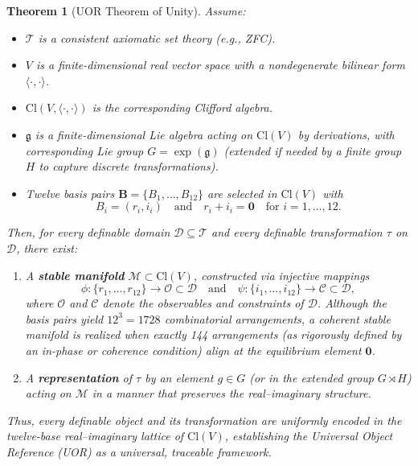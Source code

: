 \documentclass{article}
\newtheorem{theorem}{Theorem}[section]
\begin{document}
\begin{theorem}[UOR Theorem of Unity]
\label{thm:UORUnityFinal}
Assume:
\begin{itemize}
    \item $\mathcal{T}$ is a consistent axiomatic set theory (e.g., ZFC).
    \item $V$ is a finite-dimensional real vector space with a nondegenerate bilinear form $\langle\cdot,\cdot\rangle$.
    \item $\mathrm{Cl}(V,\langle\cdot,\cdot\rangle)$ is the corresponding Clifford algebra.
    \item $\mathfrak{g}$ is a finite-dimensional Lie algebra acting on $\mathrm{Cl}(V)$ by derivations, with corresponding Lie group $G = \exp(\mathfrak{g})$ (extended if needed by a finite group $H$ to capture discrete transformations).
    \item Twelve basis pairs $\mathbf{B} = \{B_1,\dots,B_{12}\}$ are selected in $\mathrm{Cl}(V)$ with
    \[
    B_i = (r_i, i_i) \quad \text{and} \quad r_i + i_i = \mathbf{0} \quad \text{for } i=1,\dots,12.
    \]
\end{itemize}
Then, for every definable domain $\mathcal{D}\subseteq \mathcal{T}$ and every definable transformation $\tau$ on $\mathcal{D}$, there exist:
\begin{enumerate}
    \item A \textbf{stable manifold} $\mathcal{M} \subset \mathrm{Cl}(V)$, constructed via injective mappings 
    \[
    \phi:\{r_1,\dots,r_{12}\}\to \mathcal{O}\subset \mathcal{D} \quad \text{and} \quad \psi:\{i_1,\dots,i_{12}\}\to \mathcal{C}\subset \mathcal{D},
    \]
    where $\mathcal{O}$ and $\mathcal{C}$ denote the observables and constraints of $\mathcal{D}$. Although the basis pairs yield $12^3=1728$ combinatorial arrangements, a coherent stable manifold is realized when exactly 144 arrangements (as rigorously defined by an in-phase or coherence condition) align at the equilibrium element $\mathbf{0}$.
    
    \item A \textbf{representation} of $\tau$ by an element $g \in G$ (or in the extended group $G \rtimes H$) acting on $\mathcal{M}$ in a manner that preserves the real--imaginary structure.
\end{enumerate}
Thus, every definable object and its transformation are uniformly encoded in the twelve-base real--imaginary lattice of $\mathrm{Cl}(V)$, establishing the Universal Object Reference (UOR) as a universal, traceable framework.
\end{theorem}
\end{document}

